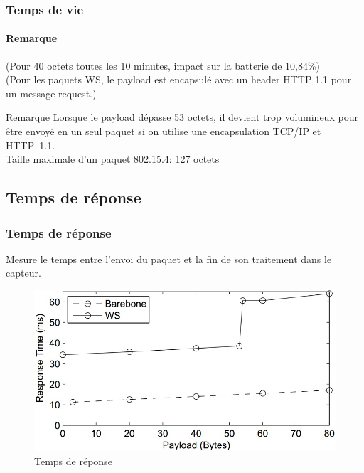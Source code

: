 \begin{frame}
 \frametitle{Temps de vie}
 \framesubtitle{Remarque}
 (Pour 40 octets toutes les 10 minutes, impact sur la batterie de 10,84\%)\\
 (Pour les paquets WS, le payload est encapsulé avec un header HTTP 1.1 pour un message request.)\\
 \vspace{3mm}
 \begin{block}{Remarque}
  Lorsque le payload dépasse 53 octets, il devient trop volumineux pour être envoyé en un seul paquet si on utilise une encapsulation TCP/IP et HTTP~1.1.\\
  \alert{Taille maximale d'un paquet 802.15.4: 127 octets}
 \end{block}
\end{frame}


\subsection{Temps de réponse}
\begin{frame}
 \frametitle{Temps de réponse}
 Mesure le temps entre l'envoi du paquet et la fin de son traitement dans le capteur.
 \begin{figure}
  \centering
  \includegraphics[scale=0.35]{figures/treponse.jpg}
  \caption{Temps de réponse}
 \end{figure} 
\end{frame}
 
